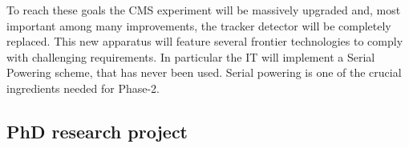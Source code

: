 \documentclass[a4paper,11pt,english]{article}
\begin{document}
To reach these goals the CMS experiment will be massively upgraded and, most important among many improvements, the tracker detector will be completely replaced. This new apparatus will feature several frontier technologies to comply with challenging requirements. In particular the IT %
will implement a Serial Powering scheme, that has never been used.  Serial powering is one of the crucial ingredients needed for Phase-2. %

\subsection*{PhD research project}
\end{document}

